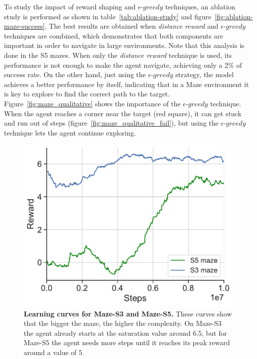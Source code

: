 To study the impact of reward shaping and $\epsilon\text{-}greedy$ techniques, an ablation study is performed as shown in table~\ref{tab:ablation-study} and figure~\ref{fig:ablation-maze-success}.
The best results are obtained when \textit{distance reward} and $\epsilon\text{-}greedy$ techniques are combined, which demonstrates that both components are important in order to navigate in large environments.
Note that this analysis is done in the S5 mazes.
When only the \textit{distance reward} technique is used, its performance is not enough to make the agent navigate, achieving only a 2\% of success rate.
On the other hand, just using the $\epsilon\text{-}greedy$ strategy, the model achieves a better performance by itself, indicating that in a Maze environment it is key to explore to find the correct path to the target.
Figure~\ref{fig:maze_qualitative} shows the importance of the $\epsilon\text{-}greedy$ technique.
When the agent reaches a corner near the target (red square), it can get stuck and run out of steps (figure~\ref{fig:maze_qualitative_fail}), but using the $\epsilon\text{-}greedy$ technique lets the agent continue exploring.

\begin{figure}
    \centering
    \includegraphics[width=0.8\linewidth]{figures/understanding_vsn/S3_S5_reward}
    \caption{\textbf{Learning curves for Maze-S3 and Maze-S5.} These curves show that the bigger the maze, the higher the complexity. On Maze-S3 the agent already starts at the saturation value around 6.5, but for Maze-S5 the agent needs more steps until it reaches its peak reward around a value of 5.}
    \label{fig:reward-maze-results}
\end{figure}

